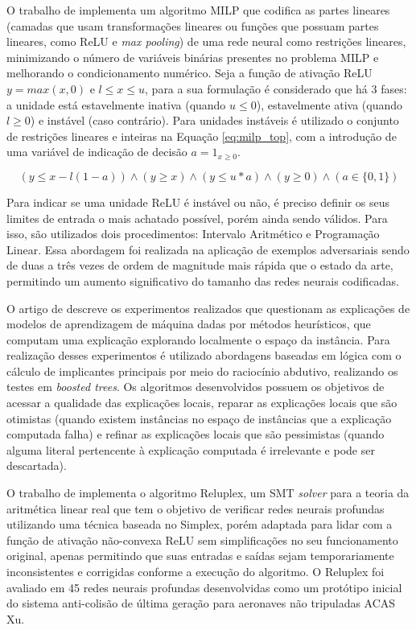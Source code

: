 O trabalho de  implementa um algoritmo MILP que codifica as partes lineares (camadas que usam transformações lineares ou funções que possuam partes lineares, como ReLU e \textit{max pooling}) de uma rede neural como restrições lineares, minimizando o número de variáveis binárias presentes no problema MILP e melhorando o condicionamento numérico. Seja a função de ativação ReLU $y = max(x, 0)$ e $l \leq x \leq u$, para a sua formulação é considerado que há 3 fases: a unidade está estavelmente inativa (quando $u \leq 0$), estavelmente ativa (quando $l \geq 0$) e instável (caso contrário). Para unidades instáveis é utilizado o conjunto de restrições lineares e inteiras na Equação \ref{eq:milp_top}, com a introdução de uma variável de indicação de decisão $a = 1_{x \geq 0}$.

\begin{equation}
    (y \leq x - l(1- a)) \wedge (y \geq x) \wedge (y \leq u*a) \wedge (y \geq 0) \wedge (a \in \{0, 1\})
    \label{eq:milp_top}
\end{equation}

Para indicar se uma unidade ReLU é instável ou não, é preciso definir os seus limites de entrada o mais achatado possível, porém ainda sendo válidos. Para isso, são utilizados dois procedimentos: Intervalo Aritmético e Programação Linear. Essa abordagem foi realizada na aplicação de exemplos adversariais sendo de duas a três vezes de ordem de magnitude mais rápida que o estado da arte, permitindo um aumento significativo do tamanho das redes neurais codificadas.

O artigo de  descreve os experimentos realizados que questionam as explicações de modelos de aprendizagem de máquina dadas por métodos heurísticos, que computam uma explicação explorando localmente o espaço da instância. Para realização desses experimentos é utilizado abordagens baseadas em lógica com o cálculo de implicantes principais por meio do raciocínio abdutivo, realizando os testes em \textit{boosted trees}. Os algoritmos desenvolvidos possuem os objetivos de acessar a qualidade das explicações locais, reparar as explicações locais que são otimistas (quando existem instâncias no espaço de instâncias que a explicação computada falha) e refinar as explicações locais que são pessimistas (quando alguma literal pertencente à explicação computada é irrelevante e pode ser descartada).

O trabalho de  implementa o algoritmo Reluplex, um SMT \textit{solver} para a teoria da aritmética linear real que tem o objetivo de verificar redes neurais profundas utilizando uma técnica baseada no Simplex, porém adaptada para lidar com a função de ativação não-convexa ReLU sem simplificações no seu funcionamento original, apenas permitindo que suas entradas e saídas sejam temporariamente inconsistentes e corrigidas conforme a execução do algoritmo. O Reluplex foi avaliado em 45 redes neurais profundas desenvolvidas como um protótipo inicial do sistema anti-colisão de última geração para aeronaves não tripuladas ACAS Xu. 

